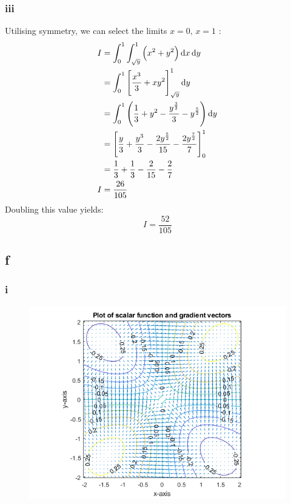 \documentclass[11pt]{article}
\numberwithin{equation}{section}
\begin{document}
\subsubsection{iii}
Utilising symmetry, we can select the limits $x = 0, \, x=1$ :
\begin{align}
    I &= \int_0^1 \int_{\sqrt{y}}^1 \left(x^2 + y^2\right) \dif x \dif y\\
    &= \int_0^1 \left[\frac{x^3}{3} + xy^2\right]_{\sqrt{y}}^1 \dif y\\
    &= \int_0^1 \left(\frac{1}{3} + y^2 - \frac{y^{\frac{3}{2}}}{3} - y^{\frac{5}{2}}\right) \dif y\\
    &= \left[\frac{y}{3} + \frac{y^3}{3} - \frac{2y^{\frac{5}{2}}}{15} - \frac{2y^{\frac{7}{2}}}{7}\right]_0^1\\
    &= \frac{1}{3} + \frac{1}{3} - \frac{2}{15} - \frac{2}{7}\\
    I &= \frac{26}{105}
\end{align}
Doubling this value yields:
\begin{equation}
    I = \frac{52}{105}
\end{equation}
\subsection{f}
\subsubsection{i}
\begin{figure}[H]
    \centering
    \includegraphics[width = 0.75 \textwidth]{./img/q1fi.png}
    \caption{}
\end{figure}

\end{document}
